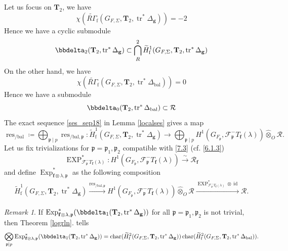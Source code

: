 \documentclass[10pt]{amsart}
\numberwithin{equation}{section}
\theoremstyle{definition}
\theoremstyle{remark} %
\newtheorem{rmk}[thm]{Remark}
\DeclareMathOperator{\Char}{char}
\newcommand{\Exp}{\operatorname{Exp}}
\newcommand{\EXP}{\operatorname{EXP}}
\newcommand{\id}{\operatorname{id}}
\DeclareMathOperator{\res}{res}
\DeclareMathOperator{\tr}{{tr}^*}
\newcommand{\f}{\mathbf{f}}
\newcommand{\scrF}{\mathscr{F}}
\newcommand{\g}{\mathbf{g}}
\newcommand{\p}{\mathfrak{p}}
\newcommand{\R}{\mathcal{R}}
\newcommand{\T}{\mathbf{T}}
\newcommand{\hotimes}{\widehat{\otimes}}
\begin{document}
		\subsubsection{}
		Let us focus on $\T_{2} $, we have $$ \chi(\widetilde{R\Gamma}_{\mathrm{f}}(G_{F,\Sigma}, \T_2, \operatorname{tr}^*\Delta_{\g})) = -2 $$
		Hence we have a cyclic submodule
		$$ \bbdelta_2(\T_2, \operatorname{tr}^*\Delta_{\g}) \subset \bigcap^2_R \widetilde{H}^1_{\mathrm{f}}(G_{F,\Sigma}, \T_2, \operatorname{tr}^*\Delta_{\g}) $$
		On the other hand, we have
		$$ \chi(\widetilde{R\Gamma}_{\mathrm{f}}(G_{F,\Sigma},\T_2, \operatorname{tr}^*\Delta_{\mathrm{bal}})) = 0 $$
		Hence we have a submodule 
		$$ \bbdelta_0(\T_2, \operatorname{tr}^*\Delta_{\mathrm{bal}}) \subset \R$$
		The exact sequence \eqref{ses_sep18} in Lemma \ref{localses} gives a map
		\begin{equation}
			\res_{/\mathrm{bal}} \coloneqq \bigoplus_{\p \mid p}\res_{/\mathrm{bal}, \p} \colon \widetilde{H}^1_{\mathrm{f}}(G_{F,\Sigma}, \T_2, \operatorname{tr}^*\Delta_{\g})\rightarrow \bigoplus_{\p \mid p}H^1(G_{F_{\p}},\scrF^-_{\p} T_{\f}(\lambda)) \hotimes_O \R.
		\end{equation}
		Let us fix trivializations for $ \p = \p_1, \p_2 $ compatible with \eqref{7.3} (cf. \textsection \ref{6.1.3})
		$$\EXP^*_{\scrF^-_{\p} T_{\f} (\lambda)} \colon H^1(G_{F_{\p}},\scrF^-_{\p} T_{\f} (\lambda)) \xrightarrow{\sim} \R_\f $$
		and define $ \Exp^*_{\f \otimes \lambda,\p}$ as the following composition \begin{align*}
			\widetilde{H}^1_{\mathrm{f}}(G_{F,\Sigma}, \T_2, \operatorname{tr}^*\Delta_{\g}) \xrightarrow{\res_{/\mathrm{bal}, \p}} H^1(G_{F_{\p}},\scrF^-_{\p} T_{\f}(\lambda)) \hotimes_O \R 
			\xrightarrow{\EXP^*_{\scrF^-_{\p} T_{\f} (\lambda)} \otimes \id } \R.
		\end{align*}
		\begin{rmk} \label{rmk : ExpT2}
			If $ \Exp^*_{\f \otimes \lambda,\p}(\bbdelta_1(\T_{2}, \tr \Delta_{\g})) $ for all $ \p = \p_1, \p_2 $ is not trivial, then Theorem \ref{logrln}. tells 
			\begin{equation}
				\bigotimes_{\p \mid p} \Exp^*_{\f \otimes \lambda,\p} (\bbdelta_1(\T_{2}, \tr \Delta_{\g})) = \Char (\widetilde{H}^2_{\mathrm{f}}(G_{F,\Sigma}, \T_2, \operatorname{tr}^*\Delta_{\g})) \Char(\widetilde{H}^2_{\mathrm{f}}(G_{F,\Sigma}, \T_2, \operatorname{tr}^*\Delta_{\mathrm{bal}})).
			\end{equation}
			
		\end{rmk}
\end{document}

